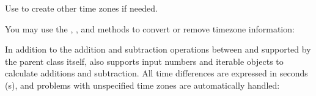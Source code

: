 \documentclass[letterpaper,10pt,english]{sphinxmanual}
\begin{document}
\sphinxAtStartPar
Use  to create other time zones if needed.

\sphinxAtStartPar
You may use the , , and  methods to convert or remove timezone information:

\begin{sphinxVerbatim}[commandchars=\\\{\}]
   
\end{sphinxVerbatim}

\sphinxAtStartPar
In addition to the addition and subtraction operations between  and  supported by the parent class itself,  also supports input numbers and iterable objects  to calculate additions and subtraction. All time differences are expressed in seconds (s), and problems with unspecified time zones are automatically handled:
\end{document}
